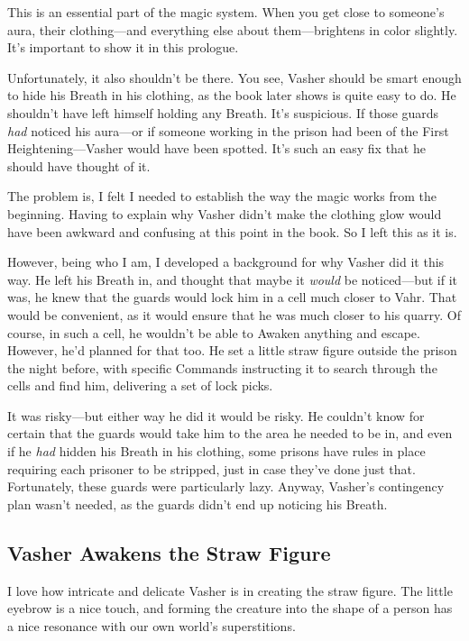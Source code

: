This is an essential part of the magic system. When you get close to someone’s aura, their clothing—and everything else about them—brightens in color slightly. It’s important to show it in this prologue.

Unfortunately, it also shouldn’t be there. You see, Vasher should be smart enough to hide his Breath in his clothing, as the book later shows is quite easy to do. He shouldn’t have left himself holding any Breath. It’s suspicious. If those guards \textit{had} noticed his aura—or if someone working in the prison had been of the First Heightening—Vasher would have been spotted. It’s such an easy fix that he should have thought of it.

The problem is, I felt I needed to establish the way the magic works from the beginning. Having to explain why Vasher didn’t make the clothing glow would have been awkward and confusing at this point in the book. So I left this as it is.

However, being who I am, I developed a background for why Vasher did it this way. He left his Breath in, and thought that maybe it \textit{would} be noticed—but if it was, he knew that the guards would lock him in a cell much closer to Vahr. That would be convenient, as it would ensure that he was much closer to his quarry. Of course, in such a cell, he wouldn’t be able to Awaken anything and escape. However, he’d planned for that too. He set a little straw figure outside the prison the night before, with specific Commands instructing it to search through the cells and find him, delivering a set of lock picks.

It was risky—but either way he did it would be risky. He couldn’t know for certain that the guards would take him to the area he needed to be in, and even if he \textit{had} hidden his Breath in his clothing, some prisons have rules in place requiring each prisoner to be stripped, just in case they’ve done just that. Fortunately, these guards were particularly lazy. Anyway, Vasher’s contingency plan wasn’t needed, as the guards didn’t end up noticing his Breath.

\subsection*{Vasher Awakens the Straw Figure}

I love how intricate and delicate Vasher is in creating the straw figure. The little eyebrow is a nice touch, and forming the creature into the shape of a person has a nice resonance with our own world’s superstitions.

